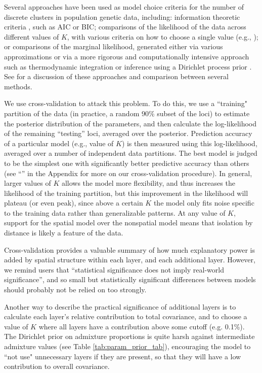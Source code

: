 \documentclass[12pt]{article}
\newcommand{\secref}[1]{``\nameref{#1}''}
\begin{document}
Several approaches have been used as model choice criteria 
for the number of discrete clusters in population genetic data, including: 
information theoretic criteria \citep[e.g.][]{ADMIXTURE}, such as AIC or BIC;
comparisons of the likelihood of the data across different values of $K$, 
with various criteria on how to choose a single value (e.g., \citep{Evanno2005});
or comparisons of the marginal likelihood, 
generated either via various approximations \citep[e.g.][]{STRUCTURE}
or via a more rigorous and computationally intensive approach such as thermodynamic integration \citep{verity_nichols2016}
or inference using a Dirichlet process prior \citep{huelsenbeck2007inference}.
See \cite{verity_nichols2016} for a discussion of these approaches and comparison
between several methods.

We use cross-validation \citep[similar in spirit to][]{ADMIXTURE_xval} to attack this problem.
To do this,
we use a ``training" partition of the data (in practice, a random 90\% subset of the loci)
to estimate the posterior distribution of the parameters,
and then calculate the log-likelihood of the remaining ``testing'' loci,
averaged over the posterior.
Prediction accuracy of a particular model (e.g., value of $K$)
is then measured using this log-likelihood,
averaged over a number of independent data partitions.
The best model is judged to be the simplest one with significantly better predictive accuracy
than others (see \secref{Xvalidation} in the Appendix for more on our cross-validation procedure).
In general, larger values of $K$ allows the model more flexibility,
and thus increases the likelihood of the training partition, 
but this improvement in the likelihood will plateau (or even peak), 
since above a certain $K$ the model only fits noise specific to the training data 
rather than generalizable patterns.
At any value of $K$, support for the spatial model over the nonspatial model 
means that isolation by distance is likely a feature of the data.

Cross-validation provides a valuable summary of how much explanatory power
is added by spatial structure within each layer, and each additional layer.
However, we remind users that ``statistical significance does not imply real-world significance'',
and so small but statistically significant differences between models
should probably not be relied on too strongly.

Another way to describe the practical significance of additional layers
is to calculate each layer's relative contribution to total covariance, 
and to choose a value of $K$ where all layers have a contribution above some cutoff (e.g. 0.1\%).
The Dirichlet prior on admixture proportions
is quite harsh against intermediate admixture values (see Table \ref{tab:param_prior_tab}),  
encouraging the model to ``not use" unnecessary layers if they are present, 
so that they will have a low contribution to overall covariance.
\end{document}
